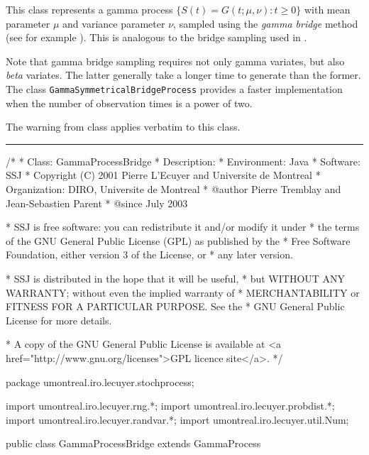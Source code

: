 
This class represents a gamma process
$\{ S(t) = G(t; \mu, \nu) : t \geq 0 \}$ with mean parameter $\mu$ and
variance parameter $\nu$, sampled using the \emph{gamma bridge} method
(see for example \cite{fRIB02a,fAVR03a}).
This is analogous to the bridge sampling used in
.

Note that gamma bridge sampling requires not only gamma variates, but also
\emph{beta} variates. The latter generally take a longer time to generate
than the former. The class \texttt{GammaSymmetricalBridgeProcess} provides
a faster implementation when the number of observation times
is a power of two.

The warning from class  applies verbatim
to this class.

\bigskip\hrule\bigskip

\begin{code}
\begin{hide}
/*
 * Class:        GammaProcessBridge
 * Description:
 * Environment:  Java
 * Software:     SSJ
 * Copyright (C) 2001  Pierre L'Ecuyer and Universite de Montreal
 * Organization: DIRO, Universite de Montreal
 * @author       Pierre Tremblay and Jean-Sebastien Parent
 * @since        July 2003

 * SSJ is free software: you can redistribute it and/or modify it under
 * the terms of the GNU General Public License (GPL) as published by the
 * Free Software Foundation, either version 3 of the License, or
 * any later version.

 * SSJ is distributed in the hope that it will be useful,
 * but WITHOUT ANY WARRANTY; without even the implied warranty of
 * MERCHANTABILITY or FITNESS FOR A PARTICULAR PURPOSE.  See the
 * GNU General Public License for more details.

 * A copy of the GNU General Public License is available at
   <a href="http://www.gnu.org/licenses">GPL licence site</a>.
 */
\end{hide}
package umontreal.iro.lecuyer.stochprocess;\begin{hide}
import umontreal.iro.lecuyer.rng.*;
import umontreal.iro.lecuyer.probdist.*;
import umontreal.iro.lecuyer.randvar.*;
import umontreal.iro.lecuyer.util.Num;
\end{hide}

public class GammaProcessBridge extends GammaProcess \begin{hide} {
    protected BetaGen      Bgen;
    protected double       mu2OverNu,
                           mu2dTOverNu;
    protected double[]     bMu2dtOverNuL,  // For precomputations for G Bridge
                           bMu2dtOverNuR;
    protected int[]        wIndexList;
    protected int          bridgeCounter = -1; // Before 1st observ
\end{hide}
\end{code}
